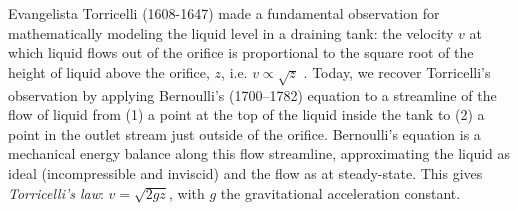\documentclass[a4paper,fleqn]{cas-dc}
\begin{document}

Evangelista Torricelli (1608-1647) made a fundamental observation for mathematically modeling the liquid level in a draining tank: 
the velocity $v$ at which liquid flows out of the orifice is proportional to the square root of the height of liquid above the orifice, $z$, i.e. $v\propto \sqrt{z}$ \cite{mills1982newton,dorfman1958life}.
Today, we recover Torricelli's observation by applying Bernoulli's (1700–1782) equation \cite{welty2020fundamentals} to a streamline of the flow of liquid from (1) a point at the top of the liquid inside the tank to (2) a point in the outlet stream just outside of the orifice. 
Bernoulli's equation is a mechanical energy balance along this flow streamline, approximating the liquid as ideal (incompressible and inviscid) and the flow as at steady-state. 
This gives \emph{Torricelli's law}: $v=\sqrt{2 g z}$, with $g$ the gravitational acceleration constant. \cite{d2021torricelli,teoman2022discharge}
\end{document}
